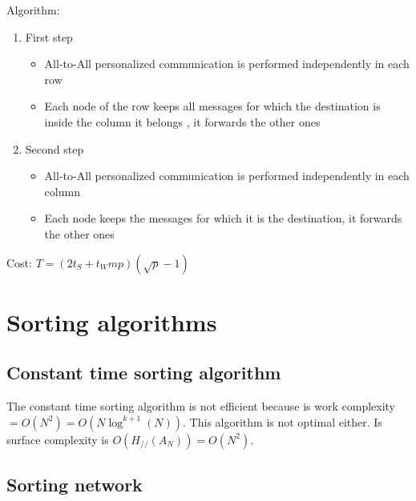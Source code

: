 \documentclass[11pt,a4paper]{report}
\begin{document}
Algorithm:

\begin{enumerate}
    \item First step
    \begin{itemize}
        \item All-to-All personalized communication is performed independently 
        in each row
        \item Each node of the row keeps all messages for which the destination 
        is inside the column it belongs , it forwards the other ones
    \end{itemize}

    \item Second step
    \begin{itemize}
        \item All-to-All personalized communication is performed independently 
        in each column
        
        \item Each node keeps the messages for which it is the destination, it 
        forwards the other ones
    \end{itemize}
\end{enumerate}

Cost: $ T=(2t_{S} +t_{W}mp)(\sqrt{p} - 1) $


\chapter{Sorting algorithms} %
\label{cha:Sorting algorithms}

\section{Constant time sorting algorithm} %
\label{sec:Constant time sorting algorithm}

The constant time sorting algorithm is not efficient because is work complexity $ = O(N^2) = O(N \log^{k+1}(N))$. This algorithm is not optimal either. Is surface complexity is $O(H_{//}(A_N)) = O(N^2)$.


\section{Sorting network} %
\label{sec:Sorting network}
\end{document}
